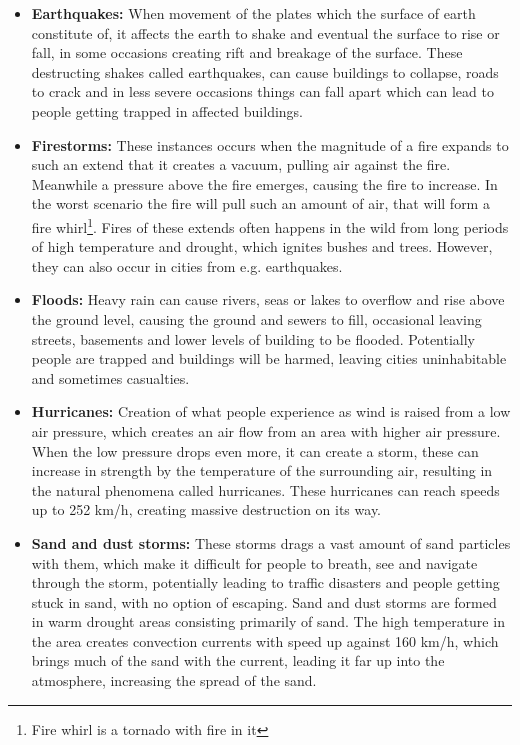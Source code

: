 \begin{itemize}\label{Natural_Disasters_List} %
    \item \textbf{Earthquakes:} When movement of the plates which the surface of earth constitute of, it affects the earth to shake and eventual the surface to rise or fall, in some occasions creating rift and breakage of the surface. These destructing shakes called earthquakes, can cause buildings to collapse, roads to crack and in less severe occasions things can fall apart which can lead to people getting trapped in affected buildings.  
    \item \textbf{Firestorms:} These instances occurs when the magnitude of a fire expands to such an extend that it creates a vacuum, pulling air against the fire. Meanwhile a pressure above the fire emerges, causing the fire to increase. In the worst scenario the fire will pull such an amount of air, that will form a fire whirl\footnote{Fire whirl is a tornado with fire in it}. Fires of these extends often happens in the wild from long periods of high temperature and drought, which ignites bushes and trees. However, they can also occur in cities from e.g. earthquakes. 
    \item \textbf{Floods:} Heavy rain can cause rivers, seas or lakes to overflow and rise above the ground level, causing the ground and sewers to fill, occasional leaving streets, basements and lower levels of building to be flooded. Potentially people are trapped and buildings will be harmed, leaving cities uninhabitable and sometimes casualties. 
    \item \textbf{Hurricanes:} Creation of what people experience as wind is raised from a low air pressure, which creates an air flow from an area with higher air pressure. When the low pressure drops even more, it can create a storm, these can increase in strength by the temperature of the surrounding air, resulting in the natural phenomena called hurricanes. These hurricanes can reach speeds up to 252 km/h, creating massive destruction on its way. \cite{SearchAndRescue:Hurricane_speeds}
    \item \textbf{Sand and dust storms:} These storms drags a vast amount of sand particles with them, which make it difficult for people to breath, see and navigate through the storm, potentially leading to traffic disasters and people getting stuck in sand, with no option of escaping. Sand and dust storms are formed in warm drought areas consisting primarily of sand. The high temperature in the area creates convection currents with speed up against 160 km/h, which brings much of the sand with the current, leading it far up into the atmosphere, increasing the spread of the sand. 

\end{itemize}
